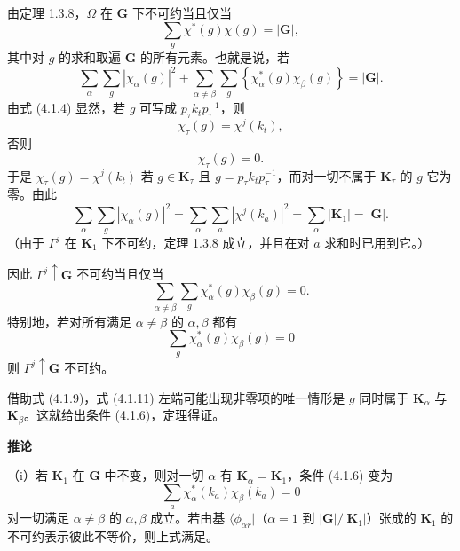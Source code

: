 由定理 1.3.8，$\Omega$ 在 $\mathbf{G}$ 下不可约当且仅当
\begin{equation*}
\sum_{g}\chi^{*}(g)\chi(g) = |\mathbf{G}|,
\tag{4.1.7}
\end{equation*}
其中对 $g$ 的求和取遍 $\mathbf{G}$ 的所有元素。也就是说，若
\begin{equation*}
\sum_{\alpha}\sum_{g}|\chi_{\alpha}(g)|^{2} + \sum_{\alpha \neq \beta}\sum_{g}\left\{\chi^{*}_{\alpha}(g)\chi_{\beta}(g)\right\} = |\mathbf{G}|.
\tag{4.1.8}
\end{equation*}
由式 (4.1.4) 显然，若 $g$ 可写成 $p_{\tau}k_{t}p^{-1}_{\tau}$，则
\begin{equation*}
\chi_{\tau}(g) = \chi^{j}(k_{t}),
\tag{4.1.9a}
\end{equation*}
否则
\begin{equation*}
\chi_{\tau}(g) = 0.
\tag{4.1.9b}
\end{equation*}
于是 $\chi_{\tau}(g) = \chi^{j}(k_{t})$ 若 $g \in \mathbf{K}_{\tau}$ 且 $g = p_{\tau}k_{t}p^{-1}_{\tau}$，而对一切不属于 $\mathbf{K}_{\tau}$ 的 $g$ 它为零。由此
\begin{equation*}
\sum_{\alpha}\sum_{g}|\chi_{\alpha}(g)|^{2} = \sum_{\alpha}\sum_{a}|\chi^{j}(k_{a})|^{2} = \sum_{\alpha}|\mathbf{K}_{1}| = |\mathbf{G}|.
\end{equation*}
（由于 $\Gamma^{j}$ 在 $\mathbf{K}_{1}$ 下不可约，定理 1.3.8 成立，并且在对 $a$ 求和时已用到它。）

因此 $\Gamma^{j} \uparrow \mathbf{G}$ 不可约当且仅当
\begin{equation*}
\sum_{\alpha \neq \beta}\sum_{g}\chi^{*}_{\alpha}(g)\chi_{\beta}(g) = 0.
\tag{4.1.10}
\end{equation*}
特别地，若对所有满足 $\alpha \neq \beta$ 的 $\alpha, \beta$ 都有
\begin{equation*}
\sum_{g}\chi^{*}_{\alpha}(g)\chi_{\beta}(g) = 0
\tag{4.1.11}
\end{equation*}
则 $\Gamma^{j} \uparrow \mathbf{G}$ 不可约。

借助式 (4.1.9)，式 (4.1.11) 左端可能出现非零项的唯一情形是 $g$ 同时属于 $\mathbf{K}_{\alpha}$ 与 $\mathbf{K}_{\beta}$。这就给出条件 (4.1.6)，定理得证。

\noindent\textbf{推论}

（i）若 $\mathbf{K}_{1}$ 在 $\mathbf{G}$ 中不变，则对一切 $\alpha$ 有 $\mathbf{K}_{\alpha} = \mathbf{K}_{1}$，条件 (4.1.6) 变为
\begin{equation*}
\sum_{a}\chi^{*}_{\alpha}(k_{a})\chi_{\beta}(k_{a}) = 0
\tag{4.1.12}
\end{equation*}
对一切满足 $\alpha \neq \beta$ 的 $\alpha, \beta$ 成立。若由基 $\langle \phi_{\alpha r} |$（$\alpha = 1$ 到 $|\mathbf{G}|/|\mathbf{K}_{1}|$）张成的 $\mathbf{K}_{1}$ 的不可约表示彼此不等价，则上式满足。

